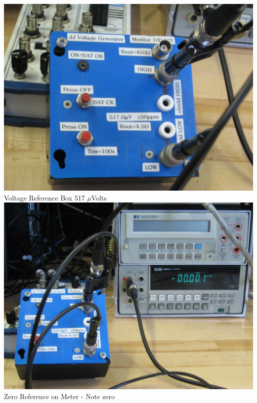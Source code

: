 \documentclass{../lab}
\begin{document}
\noindent
\begin{minipage}[t]{0.5\linewidth}
    \centering
    \href{http://experimentationlab.berkeley.edu/sites/default/files/JOS/Voltage-Ref_4058.JPG}{\includegraphics[width=\linewidth,keepaspectratio]{images/Voltage-Ref_4058.JPG}} \\
    Voltage Reference Box 517 $\mu$Volts \\\vspace{1em}
    \href{http://experimentationlab.berkeley.edu/sites/default/files/JOS/V-Ref-Setup-0_4060.JPG}{\includegraphics[width=\linewidth,keepaspectratio]{images/V-Ref-Setup-0_4060.JPG}} \\
    Zero Reference on Meter - Note zero
\end{minipage}
\end{document}
